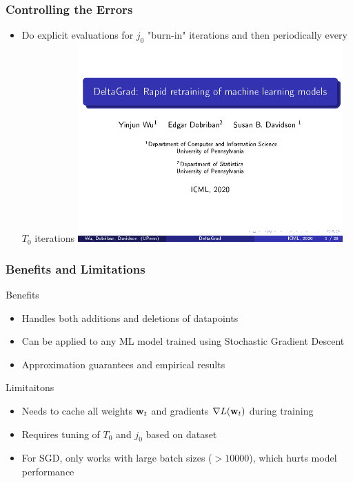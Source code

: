 \documentclass[pdf]{beamer}
\begin{document}
\begin{frame}
  \frametitle{Controlling the Errors}
  \begin{itemize}
    \item Do explicit evaluations for $j_{0}$ "burn-in" iterations and then periodically every $T_{0}$ iterations
    \includegraphics[page=46,clip,trim=0.5cm 1cm 0cm 1cm,width=0.8\textwidth]{images/Slides.pdf}
  \end{itemize}
\end{frame}

\begin{frame}
  \frametitle{Benefits and Limitations}
  \begin{block}{Benefits}
    \begin{itemize}
      \item Handles both additions and deletions of datapoints
      \item Can be applied to any ML model trained using Stochastic Gradient Descent
      \item Approximation guarantees and empirical results
    \end{itemize}
  \end{block}
  \begin{alertblock}{Limitaitons}
    \begin{itemize}
      \item Needs to cache all weights $\textbf{w}_{t}$ and gradients $\nabla L(\textbf{w}_{t})$ during training
      \item Requires tuning of $T_{0}$ and $j_{0}$ based on dataset
      \item For SGD, only works with large batch sizes ($>10000$), which hurts model performance 
    \end{itemize}
  \end{alertblock}
  

\end{frame}
\end{document}
